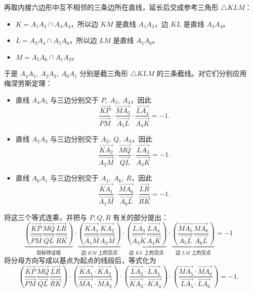 再取内接六边形中互不相邻的三条边所在直线，延长后交成参考三角形 $\triangle KLM$：
\begin{itemize}
    \item $K = A_1A_2 \cap A_3A_4$，所以边 $KM$ 是直线 $A_1A_2$，边 $KL$ 是直线 $A_3A_4$。
    \item $L = A_3A_4 \cap A_5A_6$，所以边 $LM$ 是直线 $A_5A_6$。
    \item $M = A_5A_6 \cap A_1A_2$。
\end{itemize}
于是 $A_4A_5,\ A_2A_3,\ A_6A_1$ 分别是截三角形 $\triangle KLM$ 的三条截线。对它们分别应用梅涅劳斯定理：
    \begin{itemize}
    \item 直线 $A_4A_5$ 与三边分别交于 $P,\ A_5,\ A_4$，因此
    \[
    \frac{\overrightarrow{KP}}{\overrightarrow{PM}} \cdot \frac{\overrightarrow{MA_5}}{\overrightarrow{A_5L}} \cdot \frac{\overrightarrow{LA_4}}{\overrightarrow{A_4K}} = -1.
    \]
    \item 直线 $A_2A_3$ 与三边分别交于 $A_2,\ Q,\ A_3$，因此
    \[
    \frac{\overrightarrow{KA_2}}{\overrightarrow{A_2M}} \cdot \frac{\overrightarrow{MQ}}{\overrightarrow{QL}} \cdot \frac{\overrightarrow{LA_3}}{\overrightarrow{A_3K}} = -1.
    \]
    \item 直线 $A_6A_1$ 与三边分别交于 $A_1,\ A_6,\ R$，因此
    \[
    \frac{\overrightarrow{KA_1}}{\overrightarrow{A_1M}} \cdot \frac{\overrightarrow{MA_6}}{\overrightarrow{A_6L}} \cdot \frac{\overrightarrow{LR}}{\overrightarrow{RK}} = -1.
    \]
\end{itemize}
将这三个等式连乘，并把与 $P,Q,R$ 有关的部分提出：
$$ \underbrace{\left( \frac{\overrightarrow{KP}}{\overrightarrow{PM}} \frac{\overrightarrow{MQ}}{\overrightarrow{QL}} \frac{\overrightarrow{LR}}{\overrightarrow{RK}} \right)}_{\text{目标待证组}} \cdot \underbrace{\left( \frac{\overrightarrow{KA_1}}{\overrightarrow{A_1M}} \frac{\overrightarrow{KA_2}}{\overrightarrow{A_2M}} \right)}_{\text{边 } KM \text{ 上的交点}} \cdot \underbrace{\left( \frac{\overrightarrow{LA_3}}{\overrightarrow{A_3K}} \frac{\overrightarrow{LA_4}}{\overrightarrow{A_4K}} \right)}_{\text{边 } KL \text{ 上的交点}} \cdot \underbrace{\left( \frac{\overrightarrow{MA_5}}{\overrightarrow{A_5L}} \frac{\overrightarrow{MA_6}}{\overrightarrow{A_6L}} \right)}_{\text{边 } LM \text{ 上的交点}} = -1 $$
将分母方向写成以基点为起点的线段后，等式化为
\[
\left( \frac{\overrightarrow{KP}}{\overrightarrow{PM}} \frac{\overrightarrow{MQ}}{\overrightarrow{QL}} \frac{\overrightarrow{LR}}{\overrightarrow{RK}} \right)
\cdot \left( \frac{\overrightarrow{KA_1} \cdot \overrightarrow{KA_2}}{\overrightarrow{MA_1} \cdot \overrightarrow{MA_2}} \right)
\cdot \left( \frac{\overrightarrow{LA_3} \cdot \overrightarrow{LA_4}}{\overrightarrow{KA_3} \cdot \overrightarrow{KA_4}} \right)
\cdot \left( \frac{\overrightarrow{MA_5} \cdot \overrightarrow{MA_6}}{\overrightarrow{LA_5} \cdot \overrightarrow{LA_6}} \right)
= -1.
\]
